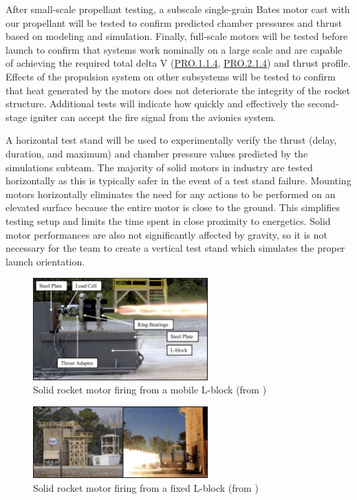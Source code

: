 After small-scale propellant testing, a subscale single-grain Bates motor cast with our propellant will be tested to confirm predicted chamber pressures and thrust based on modeling and simulation. Finally, full-scale motors will be tested before launch to confirm that systems work nominally on a large scale and are capable of achieving the required total delta V (\hyperlink{PRO.1.1.4}{PRO.1.1.4}, \hyperlink{PRO.2.1.4}{PRO.2.1.4}) and thrust profile. Effects of the propulsion system on other subsystems will be tested to confirm that heat generated by the motors does not deteriorate the integrity of the rocket structure. Additional tests will indicate how quickly and effectively the second-stage igniter can accept the fire signal from the avionics system.

A horizontal test stand will be used to experimentally verify the thrust (delay, duration, and maximum) and chamber pressure values predicted by the simulations subteam. The majority of solid motors in industry are tested horizontally as this is typically safer in the event of a test stand failure. Mounting motors horizontally eliminates the need for any actions to be performed on an elevated surface because the entire motor is close to the ground. This simplifies testing setup and limits the time spent in close proximity to energetics. Solid motor performances are also not significantly affected by gravity, so it is not necessary for the team to create a vertical test stand which simulates the proper launch orientation.

\begin{figure}
    \centering
    \includegraphics[width=0.6\textwidth]{images/srm-mobile-lblock}
    \caption{Solid rocket motor firing from a mobile L-block (from \cite{uah-thesis})}
    \label{figure:lblock1}
\end{figure}

\begin{figure}
    \centering
    \includegraphics[width=0.6\textwidth]{images/srm-firing}
    \caption{Solid rocket motor firing from a fixed L-block (from \cite{uah-thesis})}
    \label{figure:lblock2}
\end{figure}

